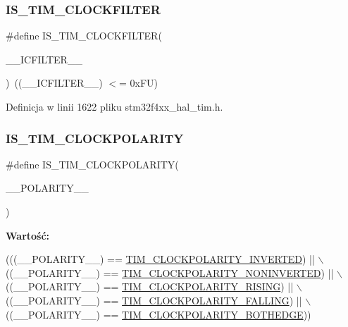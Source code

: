 \subsubsection{\texorpdfstring{I\+S\+\_\+\+T\+I\+M\+\_\+\+C\+L\+O\+C\+K\+F\+I\+L\+T\+ER}{IS\_TIM\_CLOCKFILTER}}
{\footnotesize\ttfamily \#define I\+S\+\_\+\+T\+I\+M\+\_\+\+C\+L\+O\+C\+K\+F\+I\+L\+T\+ER(\begin{DoxyParamCaption}\item[{}]{\+\_\+\+\_\+\+I\+C\+F\+I\+L\+T\+E\+R\+\_\+\+\_\+ }\end{DoxyParamCaption})~((\+\_\+\+\_\+\+I\+C\+F\+I\+L\+T\+E\+R\+\_\+\+\_\+) $<$= 0x\+F\+U)}



Definicja w linii 1622 pliku stm32f4xx\+\_\+hal\+\_\+tim.\+h.

\mbox{\label{group___t_i_m___private___macros_ga9bc34f35e8001150847d8cb4c7106fe9}} 
\subsubsection{\texorpdfstring{I\+S\+\_\+\+T\+I\+M\+\_\+\+C\+L\+O\+C\+K\+P\+O\+L\+A\+R\+I\+TY}{IS\_TIM\_CLOCKPOLARITY}}
{\footnotesize\ttfamily \#define I\+S\+\_\+\+T\+I\+M\+\_\+\+C\+L\+O\+C\+K\+P\+O\+L\+A\+R\+I\+TY(\begin{DoxyParamCaption}\item[{}]{\+\_\+\+\_\+\+P\+O\+L\+A\+R\+I\+T\+Y\+\_\+\+\_\+ }\end{DoxyParamCaption})}

{\bfseries Wartość\+:}
\begin{DoxyCode}
(((\_\_POLARITY\_\_) == \hyperlink{group___t_i_m___clock___polarity_gae4eb585c466c2b5709ae3795204e7d3f}{TIM\_CLOCKPOLARITY\_INVERTED})    || \(\backslash\)
                                            ((\_\_POLARITY\_\_) == 
      \hyperlink{group___t_i_m___clock___polarity_gaca342866be2f9364274584688c733b60}{TIM\_CLOCKPOLARITY\_NONINVERTED}) || \(\backslash\)
                                            ((\_\_POLARITY\_\_) == 
      \hyperlink{group___t_i_m___clock___polarity_ga13cc7002cfa5ee42607e1a3d85f77b10}{TIM\_CLOCKPOLARITY\_RISING})      || \(\backslash\)
                                            ((\_\_POLARITY\_\_) == 
      \hyperlink{group___t_i_m___clock___polarity_ga9c17ca08b6179792f5ced4e607808c0a}{TIM\_CLOCKPOLARITY\_FALLING})     || \(\backslash\)
                                            ((\_\_POLARITY\_\_) == 
      \hyperlink{group___t_i_m___clock___polarity_ga89bf9a7962d09fb58ceae4d1e28e1c89}{TIM\_CLOCKPOLARITY\_BOTHEDGE}))
\end{DoxyCode}


